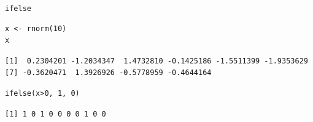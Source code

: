 \documentclass[xcolor={usenames,svgnames,dvipsnames}]{beamer}
\begin{document}
\begin{frame}[fragile,label={sec:orga8757eb}]{\texttt{ifelse}}
 \lstset{language=r,label= ,caption= ,captionpos=b,numbers=none}
\begin{lstlisting}
x <- rnorm(10)
x
\end{lstlisting}

\begin{verbatim}
[1]  0.2304201 -1.2034347  1.4732810 -0.1425186 -1.5511399 -1.9353629
[7] -0.3620471  1.3926926 -0.5778959 -0.4644164
\end{verbatim}

\lstset{language=r,label= ,caption= ,captionpos=b,numbers=none}
\begin{lstlisting}
ifelse(x>0, 1, 0)
\end{lstlisting}

\begin{verbatim}
[1] 1 0 1 0 0 0 0 1 0 0
\end{verbatim}
\end{frame}
\end{document}
